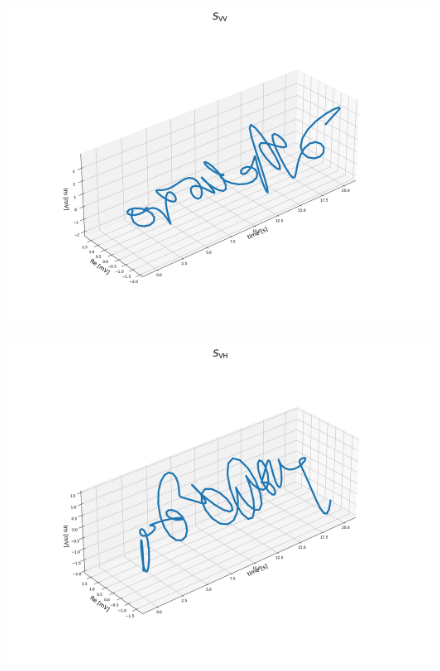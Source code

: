 \documentclass[uplatex,a4paper,12pt]{jsarticle}
\begin{document}
\begin{figure}[hbtp]
    \begin{minipage}[b]{0.48\columnwidth}
        \centering
        \includegraphics[scale=0.2]{../img/20230203_standing_4_Svv_x.png}
        \label{fig:vv}   
    \end{minipage}
    \begin{minipage}[b]{0.48\columnwidth}
        \centering
        \includegraphics[scale=0.2]{../img/20230203_standing_4_Svh_x.png}
    	\label{fig:vh}
    \end{minipage}
\end{figure}
\end{document}
